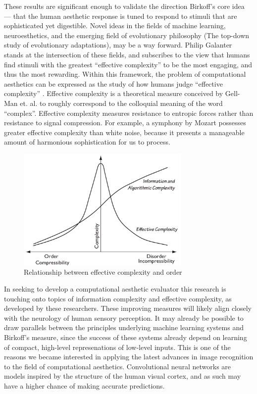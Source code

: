 \documentclass[midd]{thesis}
\begin{document}
These results are significant enough to validate the direction Birkoff's core idea --- that the human aesthetic response is tuned to respond to stimuli that are sophisticated yet digestible. Novel ideas in the fields of machine learning, neuroesthetics, and the emerging field of evolutionary philosophy (The top-down study of evolutionary adaptations), may be a way forward.
Philip Galanter stands at the intersection of these fields, and subscribes to the view that humans find stimuli with the greatest ``effective complexity'' to be the most engaging, and thus the most rewarding. Within this framework, the problem of computational aesthetics can be expressed as the study of how humans judge ``effective complexity'' \cite{galanter-1,galanter-2,galanter-3,galanter-4}. Effective complexity is a theoretical measure conceived by Gell-Man et. al. \cite{gell2004effective} to roughly correspond to the colloquial meaning of the word ``complex''. Effective complexity measures resistance to entropic forces rather than resistance to signal compression. For example, a symphony by Mozart possesses greater effective complexity than white noise, because it presents a manageable amount of harmonious sophistication for us to process.

\begin{figure}
\centering
\includegraphics[width=0.75\textwidth]{figures/effectivecomplexity.pdf}
\caption{Relationship between effective complexity and order}
\label{fig:effectivecomplexity}
\end{figure}

In seeking to develop a computational aesthetic evaluator this research is touching onto topics of information complexity and effective complexity, as developed by these researchers. These improving measures will likely align closely with the neurology of human sensory perception. It may already be possible to draw parallels between the principles underlying machine learning systems and Birkoff's measure, since the success of these systems already depend on learning of compact, high-level represenations of low-level inputs. This is one of the reasons we became interested in applying the latest advances in image recognition to the field of computational aesthetics. Convolutional neural networks are models inspired by the structure of the human visual cortex, and as such may have a higher chance of making accurate predictions.
\end{document}
